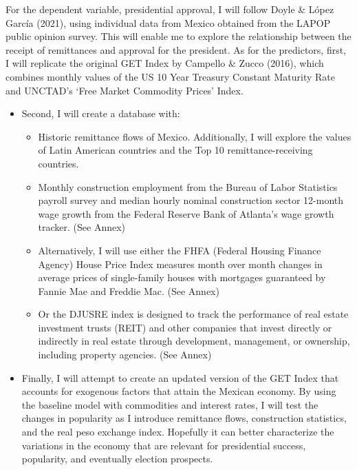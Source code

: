 \documentclass[
]{article}
\providecommand{\tightlist}{%
  \setlength{\itemsep}{0pt}\setlength{\parskip}{0pt}}
\begin{document}
For the dependent variable, presidential approval, I will follow Doyle
\& López García (2021), using individual data from Mexico obtained from
the LAPOP public opinion survey. This will enable me to explore the
relationship between the receipt of remittances and approval for the
president. As for the predictors, first, I will replicate the original
GET Index by Campello \& Zucco (2016), which combines monthly values of
the US 10 Year Treasury Constant Maturity Rate and UNCTAD's `Free Market
Commodity Prices' Index.

\begin{itemize}
\tightlist
\item
  Second, I will create a database with:

  \begin{itemize}
  \tightlist
  \item
    Historic remittance flows of Mexico. Additionally, I will explore
    the values of Latin American countries and the Top 10
    remittance-receiving countries.
  \item
    Monthly construction employment from the Bureau of Labor Statistics
    payroll survey and median hourly nominal construction sector
    12-month wage growth from the Federal Reserve Bank of Atlanta's wage
    growth tracker. (See Annex)
  \item
    Alternatively, I will use either the FHFA (Federal Housing Finance
    Agency) House Price Index measures month over month changes in
    average prices of single-family houses with mortgages guaranteed by
    Fannie Mae and Freddie Mac. (See Annex)
  \item
    Or the DJUSRE index is designed to track the performance of real
    estate investment trusts (REIT) and other companies that invest
    directly or indirectly in real estate through development,
    management, or ownership, including property agencies. (See Annex)
  \end{itemize}
\item
  Finally, I will attempt to create an updated version of the GET Index
  that accounts for exogenous factors that attain the Mexican economy.
  By using the baseline model with commodities and interest rates, I
  will test the changes in popularity as I introduce remittance flows,
  construction statistics, and the real peso exchange index. Hopefully
  it can better characterize the variations in the economy that are
  relevant for presidential success, popularity, and eventually election
  prospects.
\end{itemize}
\end{document}
